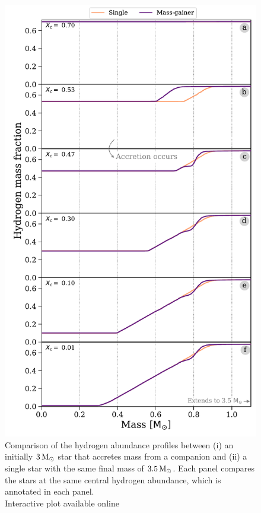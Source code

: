 \documentclass[desactivate]{aa}
\begin{document}
\begin{figure}[tb]
    \centering
    \includegraphics[width=\columnwidth]{figures/XH_profile_all.pdf}
    \caption{Comparison of the hydrogen abundance profiles between (i) an initially $3 \, {\rm M_\odot}$ star that accretes mass from a companion and (ii) a single star with the same final mass of $3.5 \, {\rm M_\odot}$. Each panel compares the stars at the same central hydrogen abundance, which is annotated in each panel.\\Interactive plot available online \href{www.tomwagg.com/html/interact/mass-gainer-asteroseismology.html\#fig2-4}{\faChartArea}}
    \label{fig:XH_profiles}
\end{figure}
\end{document}

